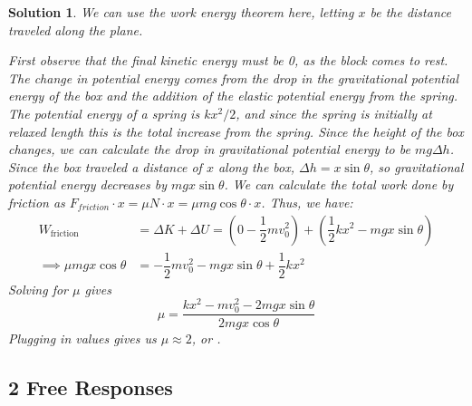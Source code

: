 \documentclass[12pt]{article}
\newtheorem*{solution}{Solution}
\theoremstyle{mystyle}
\begin{document}
\begin{solution}
    We can use the work energy theorem here, letting $x$ be the distance traveled along the plane.
    
    First observe that the final kinetic energy must be 0, as the block comes to rest. The change in potential energy comes from the drop in the gravitational potential energy of the box and the addition of the elastic potential energy from the spring. The potential energy of a spring is $kx^2/2$, and since the spring is initially at relaxed length this is the total increase from the spring. Since the height of the box changes, we can calculate the drop in gravitational potential energy to be $mg\Delta h$. Since the box traveled a distance of $x$ along the box, $\Delta h = x\sin\theta$, so gravitational potential energy decreases by $mgx\sin\theta$. We can calculate the total work done by friction as $F_{friction} \cdot x = \mu N \cdot x = \mu mg\cos\theta \cdot x$. Thus, we have:
    \begin{align*}
        W_\mathrm{friction}&=\Delta K+\Delta U
            = \left(0 -\dfrac{1}{2}mv_0^2\right) + \left(\dfrac{1}{2}kx^2 - mgx\sin\theta\right)\\
        \implies \mu mgx\cos\theta&=
            -\dfrac{1}{2}mv_0^2-mgx\sin\theta+\dfrac{1}{2}kx^2
    \end{align*}
    Solving for $\mu$ gives \[
        \mu=\dfrac{kx^2-mv_0^2-2mgx\sin\theta}{2mgx\cos\theta}
    \]
    Plugging in values gives us $\mu\approx 2$, or .
\end{solution}


\subsection*{2 Free Responses}
\setcounter{pproblem}{0}
\end{document}
